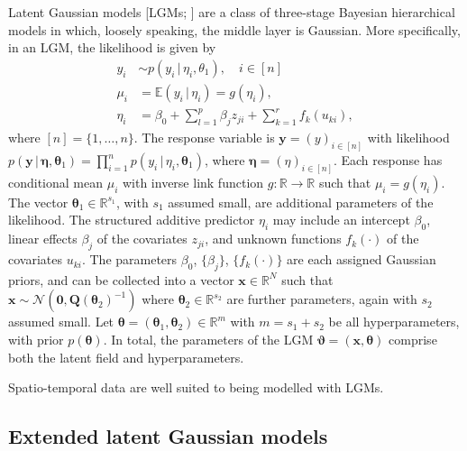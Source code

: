 \documentclass[a4paper, nobind]{templates/ociamthesis}
\newcommand{\x}{\mathbf{x}}
\newcommand{\y}{\mathbf{y}}
\newcommand{\btheta}{\bm{\theta}}
\newcommand{\bmeta}{\bm{\eta}}
\newcommand{\bvartheta}{\bm{\vartheta}}
\begin{document}
Latent Gaussian models {[}LGMs; \textcite{rue2009approximate}{]} are a class of three-stage Bayesian hierarchical models in which, loosely speaking, the middle layer is Gaussian.
More specifically, in an LGM, the likelihood is given by
\begin{align*}
y_i &\sim p(y_i \, | \, \eta_i, \theta_1), \quad i \in [n]\\
\mu_i &= \mathbb{E}(y_i \, | \, \eta_i) = g(\eta_i), \\
\eta_i &= \beta_0 + \sum_{l = 1}^{p} \beta_j z_{ji} + \sum_{k = 1}^{r} f_k(u_{ki}),
\end{align*}
where \([n] = \{1, \ldots, n\}\).
The response variable is \(\y = (y)_{i \in [n]}\) with likelihood \(p(\y \, | \, \bmeta, \btheta_1) = \prod_{i = 1}^n p(y_i \, | \, \eta_i, \btheta_1)\), where \(\bmeta = (\eta)_{i \in [n]}\).
Each response has conditional mean \(\mu_i\) with inverse link function \(g: \mathbb{R} \to \mathbb{R}\) such that \(\mu_i = g(\eta_i)\).
The vector \(\btheta_1 \in \mathbb{R}^{s_1}\), with \(s_1\) assumed small, are additional parameters of the likelihood.
The structured additive predictor \(\eta_i\) may include an intercept \(\beta_0\), linear effects \(\beta_j\) of the covariates \(z_{ji}\), and unknown functions \(f_k(\cdot)\) of the covariates \(u_{ki}\).
The parameters \(\beta_0\), \(\{\beta_j\}\), \(\{f_k(\cdot)\}\) are each assigned Gaussian priors, and can be collected into a vector \(\x \in \mathbb{R}^N\) such that \(\x \sim \mathcal{N}(\mathbf{0}, \mathbf{Q}(\btheta_2)^{-1})\) where \(\btheta_2 \in \mathbb{R}^{s_2}\) are further parameters, again with \(s_2\) assumed small.
Let \(\btheta = (\btheta_1, \btheta_2) \in \mathbb{R}^m\) with \(m = s_1 + s_2\) be all hyperparameters, with prior \(p(\btheta)\).
In total, the parameters of the LGM \(\bvartheta = (\x, \btheta)\) comprise both the latent field and hyperparameters.

Spatio-temporal data are well suited to being modelled with LGMs.

\hypertarget{extended-latent-gaussian-models}{%
\subsection{Extended latent Gaussian models}\label{extended-latent-gaussian-models}}
\end{document}
